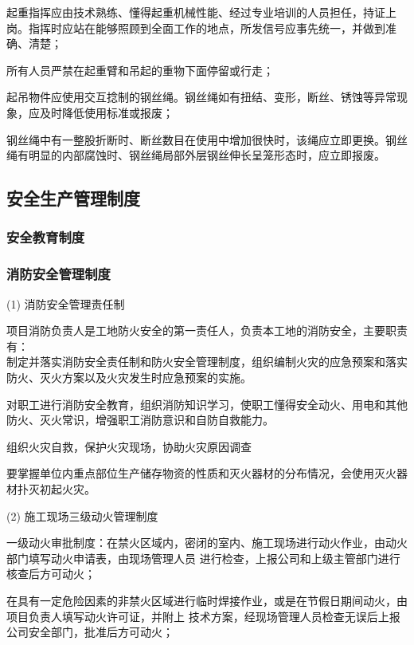  起重指挥应由技术熟练、懂得起重机械性能、经过专业培训的人员担任，持证上岗。指挥时应站在能够照顾到全面工作的地点，所发信号应事先统一，并做到准确、清楚；

 所有人员严禁在起重臂和吊起的重物下面停留或行走；

 起吊物件应使用交互捻制的钢丝绳。钢丝绳如有扭结、变形，断丝、锈蚀等异常现象，应及时降低使用标准或报废；

 钢丝绳中有一整股折断时、断丝数目在使用中增加很快时，该绳应立即更换。钢丝绳有明显的内部腐蚀时、钢丝绳局部外层钢丝伸长呈笼形态时，应立即报废。\\

\subsection{安全生产管理制度}
\subsubsection{安全教育制度}

\subsubsection{消防安全管理制度}

(1) 消防安全管理责任制

项目消防负责人是工地防火安全的第一责任人，负责本工地的消防安全，主要职责有：\\

 制定并落实消防安全责任制和防火安全管理制度，组织编制火灾的应急预案和落实防火、灭火方案以及火灾发生时应急预案的实施。

 对职工进行消防安全教育，组织消防知识学习，使职工懂得安全动火、用电和其他防火、灭火常识，增强职工消防意识和自防自救能力。

 组织火灾自救，保护火灾现场，协助火灾原因调查

 要掌握单位内重点部位生产储存物资的性质和灭火器材的分布情况，会使用灭火器材扑灭初起火灾。

(2) 施工现场三级动火管理制度

 一级动火审批制度：在禁火区域内，密闭的室内、施工现场进行动火作业，由动火部门填写动火申请表，由现场管理人员
进行检查，上报公司和上级主管部门进行核查后方可动火；

 在具有一定危险因素的非禁火区域进行临时焊接作业，或是在节假日期间动火，由项目负责人填写动火许可证，并附上
技术方案，经现场管理人员检查无误后上报公司安全部门，批准后方可动火；

